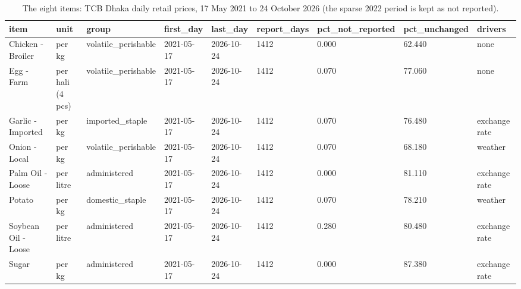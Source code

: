 \begin{table}
\caption{The eight items: TCB Dhaka daily retail prices, 17 May 2021 to 24 October 2026 (the sparse 2022 period is kept as not reported).}
\label{tab:r1}
\begin{tabular}{lllllllll}
\toprule
item & unit & group & first\_day & last\_day & report\_days & pct\_not\_reported & pct\_unchanged & drivers \\
\midrule
Chicken - Broiler & per kg & volatile\_perishable & 2021-05-17 & 2026-10-24 & 1412 & 0.000 & 62.440 & none \\
Egg - Farm & per hali (4 pcs) & volatile\_perishable & 2021-05-17 & 2026-10-24 & 1412 & 0.070 & 77.060 & none \\
Garlic - Imported & per kg & imported\_staple & 2021-05-17 & 2026-10-24 & 1412 & 0.070 & 76.480 & exchange rate \\
Onion - Local & per kg & volatile\_perishable & 2021-05-17 & 2026-10-24 & 1412 & 0.070 & 68.180 & weather \\
Palm Oil - Loose & per litre & administered & 2021-05-17 & 2026-10-24 & 1412 & 0.000 & 81.110 & exchange rate \\
Potato & per kg & domestic\_staple & 2021-05-17 & 2026-10-24 & 1412 & 0.070 & 78.210 & weather \\
Soybean Oil - Loose & per litre & administered & 2021-05-17 & 2026-10-24 & 1412 & 0.280 & 80.480 & exchange rate \\
Sugar & per kg & administered & 2021-05-17 & 2026-10-24 & 1412 & 0.000 & 87.380 & exchange rate \\
\bottomrule
\end{tabular}
\end{table}
